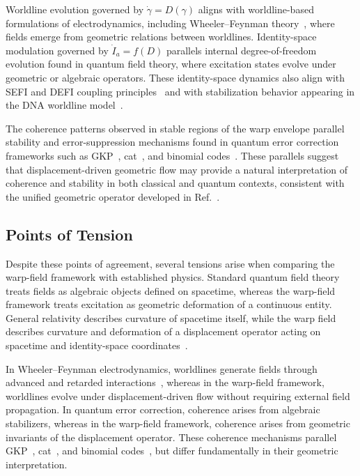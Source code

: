 \documentclass[aip,adv,reprint]{revtex4-2}
\begin{document}
Worldline evolution governed by $\dot{\gamma}=D(\gamma)$ aligns with
worldline-based formulations of electrodynamics, including Wheeler--Feynman
theory~\cite{Wheeler_Feynman_1945,Wheeler_Feynman_1949}, where fields emerge
from geometric relations between worldlines. Identity-space modulation governed
by $\dot{I}_a=f(D)$ parallels internal degree-of-freedom evolution found in
quantum field theory, where excitation states evolve under geometric or
algebraic operators. These identity-space dynamics also align with SEFI and
DEFI coupling principles~\cite{Dutton_SEFI_JMP_2026,Dutton_DEFI_2026} and with
stabilization behavior appearing in the DNA worldline model~\cite{Dutton_DNA_2026}.

The coherence patterns observed in stable regions of the warp envelope parallel
stability and error-suppression mechanisms found in quantum error correction
frameworks such as GKP~\cite{GKP_2001}, cat~\cite{Mirrahimi_2014}, and binomial
codes~\cite{Michael_2016}. These parallels suggest that displacement-driven
geometric flow may provide a natural interpretation of coherence and stability
in both classical and quantum contexts, consistent with the unified geometric
operator developed in Ref.~\cite{Dutton_Unified_JMP_2026}.

\subsection{Points of Tension}

Despite these points of agreement, several tensions arise when comparing the
warp-field framework with established physics. Standard quantum field theory
treats fields as algebraic objects defined on spacetime, whereas the warp-field
framework treats excitation as geometric deformation of a continuous entity.
General relativity describes curvature of spacetime itself, while the warp
field describes curvature and deformation of a displacement operator acting on
spacetime and identity-space coordinates~\cite{MTW_Gravitation_1973}.

In Wheeler--Feynman electrodynamics, worldlines generate fields through advanced
and retarded interactions~\cite{Wheeler_Feynman_1945,Wheeler_Feynman_1949},
whereas in the warp-field framework, worldlines evolve under displacement-driven
flow without requiring external field propagation. In quantum error correction,
coherence arises from algebraic stabilizers, whereas in the warp-field
framework, coherence arises from geometric invariants of the displacement
operator. These coherence mechanisms parallel GKP~\cite{GKP_2001}, cat~\cite{Mirrahimi_2014},
and binomial codes~\cite{Michael_2016}, but differ fundamentally in their
geometric interpretation.
\end{document}

